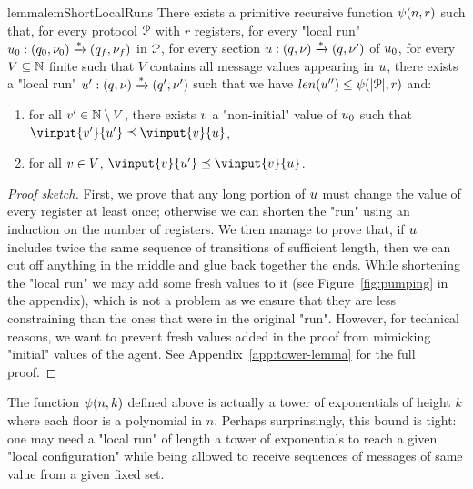 \begin{restatable}{lemma}{lemShortLocalRuns}
	\label{lem:short-local-runs}
	There exists a primitive recursive function $\psi(n,r)$ such that, for every protocol $\mathcal{P}$ with $r$ registers, for every "local run" $u_0: (q_0, \nu_0) \xrightarrow{*} (q_f, \nu_f)$ in $\mathcal{P}$, for every section $u : (q, \nu) \xrightarrow{*} (q, \nu')$ of $u_0$,  for every $V \subseteq \mathbb{N}$ finite such that $V$ contains all message values appearing in $u$, there exists a "local run" $u': (q, \nu) \xrightarrow{*} (q', \nu')$ such that we have $\length{\localrun''} \leq \towerfun(\size{\prot},r)$ and:
	\begin{enumerate}
		\item for all $v' \in \mathbb{N} \setminus V$, there exists $v$ a "non-initial" value of $u_0$ such that $\vinput{\aval'}{\localrun'}\subword \vinput{\aval}{\localrun}$,
		\item for all $v \in V$, $\vinput{\aval}{\localrun'} \subword \vinput{\aval}{\localrun}$. 
	\end{enumerate}
\end{restatable}

\begin{proof}[Proof sketch]
	First, we prove that any long portion of $u$ must change the value of every register at least once; otherwise we can shorten the "run" using an induction on the number of registers. We then manage to prove that, if $u$ includes twice the same sequence of transitions of sufficient length, then we can cut off anything in the middle and glue back together the ends. While shortening the "local run" we may add some fresh values to it (see Figure~\ref{fig:pumping} in the appendix), which is not a problem as we ensure that they are less constraining than the ones that were in the original "run". However, for technical reasons, we want to prevent fresh values added in the proof from mimicking "initial" values of the agent.
	See Appendix~\ref{app:tower-lemma} for the full proof.
\end{proof}

\begin{remark}
The function $\psi(n,k)$ defined above is actually a tower of exponentials of height $k$ where each floor is a polynomial in $n$. Perhaps surprinsingly, this bound is tight: one may need a "local run" of length a tower of exponentials to reach a given "local configuration" while being allowed to receive sequences of messages of same value from a given fixed set. 
\end{remark}

